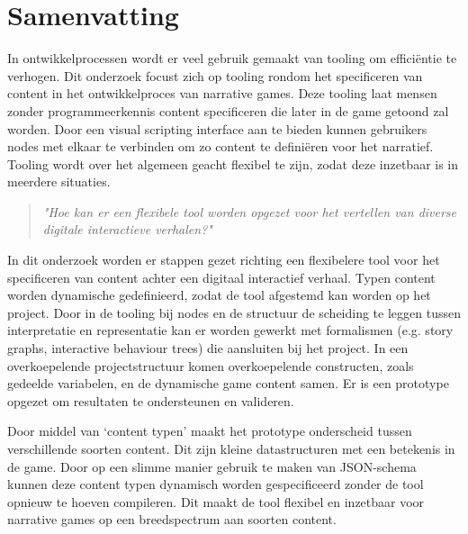 \chapter*{Samenvatting}
In ontwikkelprocessen wordt er veel gebruik gemaakt van tooling om efficiëntie te verhogen. Dit onderzoek focust zich op tooling rondom het specificeren van content in het ontwikkelproces van narrative games. Deze tooling laat mensen zonder programmeerkennis content specificeren die later in de game getoond zal worden. Door een visual scripting interface aan te bieden kunnen gebruikers nodes met elkaar te verbinden om zo content te definiëren voor het narratief.
Tooling wordt over het algemeen geacht flexibel te zijn, zodat deze inzetbaar is in meerdere situaties.
\begin{quote} 
    \centering
    \large
    \textit{
        "Hoe kan er een flexibele tool worden opgezet voor het vertellen van diverse digitale interactieve verhalen?"
    }
\end{quote}

\noindent In dit onderzoek worden er stappen gezet richting een flexibelere tool voor het specificeren van content achter een digitaal interactief verhaal. Typen content worden dynamische gedefinieerd, zodat de tool afgestemd kan worden op het project. Door in de tooling bij nodes en de structuur de scheiding te leggen tussen interpretatie en representatie kan er worden gewerkt met formalismen (e.g. story graphs, interactive behaviour trees) die aansluiten bij het project. In een overkoepelende projectstructuur komen overkoepelende constructen, zoals gedeelde variabelen, en de dynamische game content samen. Er is een prototype opgezet om resultaten te ondersteunen en valideren.
%

Door middel van ‘content typen’ maakt het prototype onderscheid tussen verschillende soorten content. Dit zijn kleine datastructuren met een betekenis in de game. Door op een slimme manier gebruik te maken van JSON-schema kunnen deze content typen dynamisch worden gespecificeerd zonder de tool opnieuw te hoeven compileren. Dit maakt de tool flexibel en inzetbaar voor narrative games op een breedspectrum aan soorten content.


